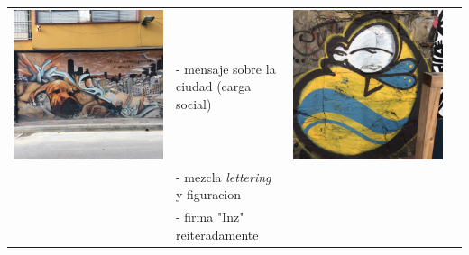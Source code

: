 \documentclass[11pt]{article}
\begin{document}
\begin{center}
\begin{tabular}{llll}
\includegraphics[width=.9\linewidth]{./graffitti/perros.JPG} & - mensaje sobre la ciudad (carga social) & \includegraphics[width=.9\linewidth]{./graffitti/gffti5.JPG} & \\
 & - mezcla \emph{lettering} y figuracion &  & \\
 & - firma "Inz" reiteradamente &  & \\
\hline
\end{tabular}
\end{center}
\end{document}
